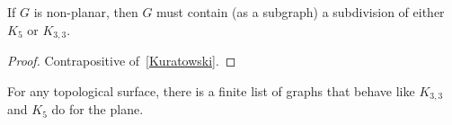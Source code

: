 \begin{thmbox}
    \begin{corollary}
        If $ G $ is non-planar, then $ G $ must contain
        (as a subgraph) a subdivision of either $ K_5 $ or $ K_{3,3} $.
    \end{corollary}
\end{thmbox}
\begin{proof}
    Contrapositive of~\ref{Kuratowski}.
\end{proof}

\begin{thmbox}
    \begin{theorem}
        For any topological surface, there is a finite list of graphs that behave
        like $ K_{3,3} $ and $ K_5 $ do for the plane.
    \end{theorem}
\end{thmbox}

